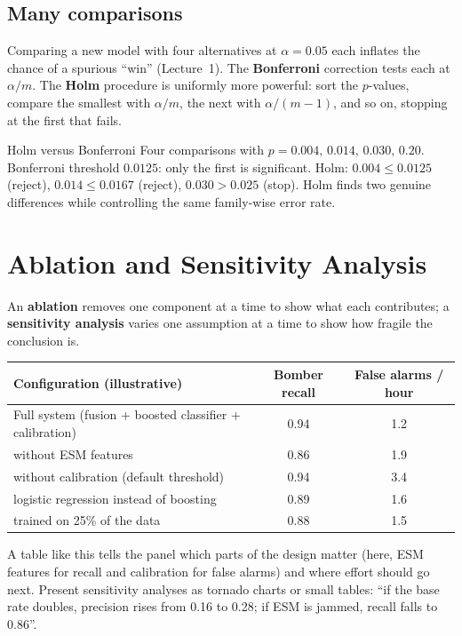 \documentclass[11pt]{article}
\begin{document}
\subsection{Many comparisons}
Comparing a new model with four alternatives at $\alpha=0.05$ each inflates the chance of a spurious ``win'' (Lecture~1). The \textbf{Bonferroni} correction tests each at $\alpha/m$. The \textbf{Holm} procedure is uniformly more powerful: sort the $p$-values, compare the smallest with $\alpha/m$, the next with $\alpha/(m-1)$, and so on, stopping at the first that fails.
\begin{example}{Holm versus Bonferroni}
Four comparisons with $p=0.004,\,0.014,\,0.030,\,0.20$. Bonferroni threshold $0.0125$: only the first is significant. Holm: $0.004\le0.0125$ (reject), $0.014\le0.0167$ (reject), $0.030>0.025$ (stop). Holm finds two genuine differences while controlling the same family-wise error rate.
\end{example}

\section{Ablation and Sensitivity Analysis}
An \textbf{ablation} removes one component at a time to show what each contributes; a \textbf{sensitivity analysis} varies one assumption at a time to show how fragile the conclusion is.
\begin{center}\small\renewcommand{\arraystretch}{1.25}\begin{tabular}{lcc}\toprule Configuration (illustrative) & Bomber recall & False alarms / hour\\\midrule
Full system (fusion + boosted classifier + calibration) & 0.94 & 1.2\\
\quad without ESM features & 0.86 & 1.9\\
\quad without calibration (default threshold) & 0.94 & 3.4\\
\quad logistic regression instead of boosting & 0.89 & 1.6\\
\quad trained on 25\% of the data & 0.88 & 1.5\\\bottomrule\end{tabular}\end{center}
A table like this tells the panel which parts of the design matter (here, ESM features for recall and calibration for false alarms) and where effort should go next. Present sensitivity analyses as tornado charts or small tables: ``if the base rate doubles, precision rises from 0.16 to 0.28; if ESM is jammed, recall falls to 0.86''.
\end{document}
